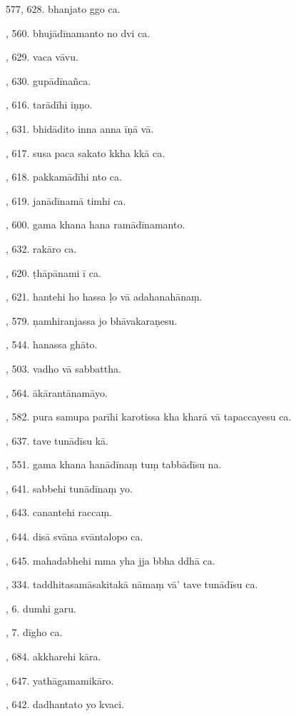 577, 628. bhanjato ggo ca.\par {}, 560. bhujādīnamanto no dvi ca.\par {}, 629. vaca vāvu.\par {}, 630. gupādīnañca.\par {}, 616. tarādīhi iṇṇo.\par {}, 631. bhidādito inna anna īṇā vā.\par {}, 617. susa paca sakato kkha kkā ca.\par {}, 618. pakkamādīhi nto ca.\par {}, 619. janādīnamā timhi ca.\par {}, 600. gama khana hana ramādīnamanto.\par {}, 632. rakāro ca.\par {}, 620. ṭhāpānami ī ca.\par {}, 621. hantehi ho hassa ḷo vā adahanahānaṃ.\par {}, 579. ṇamhiranjassa jo bhāvakaraṇesu.\par {}, 544. hanassa ghāto.\par {}, 503. vadho vā sabbattha.\par {}, 564. ākārantānamāyo.\par {}, 582. pura samupa parīhi karotissa kha kharā vā tapaccayesu ca.\par {}, 637. tave tunādīsu kā.\par {}, 551. gama khana hanādīnaṃ tuṃ tabbādīsu na.\par {}, 641. sabbehi tunādīnaṃ yo.\par {}, 643. canantehi raccaṃ.\par {}, 644. disā svāna svāntalopo ca.\par {}, 645. mahadabhehi mma yha jja bbha ddhā ca.\par {}, 334. taddhitasamāsakitakā nāmaṃ vā’ tave tunādīsu ca.\par {}, 6. dumhi garu.\par {}, 7. dīgho ca.\par {}, 684. akkharehi kāra.\par {}, 647. yathāgamamikāro.\par {}, 642. dadhantato yo kvaci.\par \noindent

